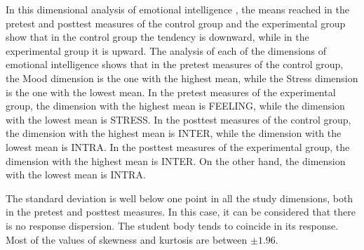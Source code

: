 \documentclass[english]{textolivre}
\begin{document}
In this dimensional analysis of emotional intelligence , the means reached in the pretest and posttest measures of the control group and the experimental group show that in the control group the tendency is downward, while in the experimental group it is upward. The analysis of each of the dimensions of emotional intelligence shows that in the pretest measures of the control group, the Mood dimension is the one with the highest mean, while the Stress dimension is the one with the lowest mean. In the pretest measures of the experimental group, the dimension with the highest mean is FEELING, while the dimension with the lowest mean is STRESS. In the posttest measures of the control group, the dimension with the highest mean is INTER, while the dimension with the lowest mean is INTRA. In the posttest measures of the experimental group, the dimension with the highest mean is INTER. On the other hand, the dimension with the lowest mean is INTRA.

The standard deviation is well below one point in all the study dimensions, both in the pretest and posttest measures. In this case, it can be considered that there is no response dispersion. The student body tends to coincide in its response. Most of the values of skewness and kurtosis are between $\pm 1.96$.
\end{document}
